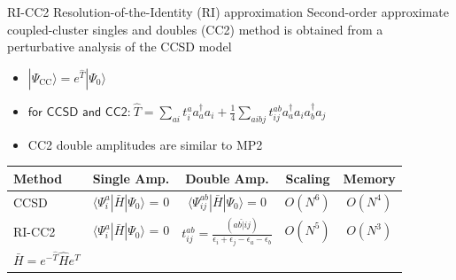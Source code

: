 \documentclass[9pt,t,xcolor=table]{beamer}
\begin{document}
\begin{frame}{\huge RI-CC2}\large
	Resolution-of-the-Identity (RI) approximation Second-order approximate coupled-cluster singles and doubles (CC2) method is obtained from a perturbative analysis of the CCSD model
	\vspace{4pt}
	\begin{itemize}
		\item $|\Psi_{\mathrm{CC}} \rangle = e^{\hat{T}} | \Psi_0 \rangle$
		\item $\textsf{for CCSD and CC2:} ~
	\hat{T} = \sum_{ai} t^a_i a_a^\dagger a_i + \frac{1}{4}\sum_{aibj} t_{ij}^{ab} a_a^\dagger a_i a_b^\dagger a_j$
		\item CC2 double amplitudes are similar to MP2
	\end{itemize} 
	\vspace{10pt}
	\begin{table}
		\centering
		\begin{tabular}{lcccc}\toprule
		\textbf{Method} & \textbf{Single Amp.} & \textbf{Double Amp.} & \textbf{Scaling} & \textbf{Memory}\\\midrule
		CCSD & $\langle \Psi^{a}_{i} | \bar{H} | \Psi_{0} \rangle$ = 0 & $\langle \Psi^{ab}_{ij} | \bar{H} | \Psi_{0} \rangle = 0 $ & $O(N^6)$ & $O(N^{4})$\\
		RI-CC2 & $\langle \Psi^{a}_{i} | \bar{H} | \Psi_{0} \rangle$ = 0 & $\displaystyle{t^{ab}_{ij} =\frac{(a b \hat{|} i j)}{\epsilon_i + \epsilon_j - \epsilon_a - \epsilon_b}}$ & $O(N^5)$ & $O(N^{3})$\\\bottomrule
		\small $\bar{H} = e^{-\hat{T}}\hat{H} e^{\hat{T}} $
		\end{tabular}
	\end{table}
	\vfill
\end{frame}
\end{document}
